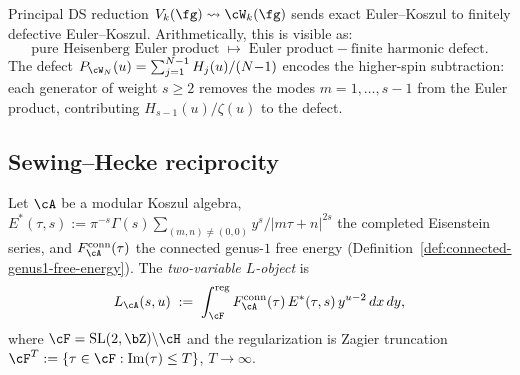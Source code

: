 \begin{remark}%
\label{rem:ds-arithmetic-defect}%
%
Principal DS reduction $V_k(\fg) \leadsto \cW_k(\fg)$
sends exact Euler--Koszul to finitely defective
Euler--Koszul.
Arithmetically, this is visible as:
\[
\text{pure Heisenberg Euler product}
\;\longmapsto\;
\text{Euler product} - \text{finite harmonic defect}.
\]
The defect $P_{\cW_N}(u) =
\sum_{j=1}^{N-1}H_j(u)/(N{-}1)$ encodes the higher-spin
subtraction: each generator of weight $s \geq 2$ removes
the modes $m = 1,\ldots,s{-}1$ from the Euler product,
contributing $H_{s-1}(u)/\zeta(u)$ to the defect.
\end{remark}

\subsection{Sewing--Hecke reciprocity}%
\label{subsec:two-variable-L}%
\label{subsec:sewing-hecke-reciprocity}%
%

\begin{definition}%
\label{def:two-variable-L}%
%
Let $\cA$ be a modular Koszul algebra,
$E^*(\tau,s) := \pi^{-s}\Gamma(s)\sum_{(m,n)\neq(0,0)}
y^s/|m\tau{+}n|^{2s}$
the completed Eisenstein series, and
$F_\cA^{\mathrm{conn}}(\tau)$
the connected genus-$1$ free energy
(Definition~\ref{def:connected-genus1-free-energy}).
The \emph{two-variable $L$-object} is
\begin{equation}\label{eq:two-variable-L}
L_\cA(s,u)
\;:=\;
\int_{\cF}^{\mathrm{reg}}
F_\cA^{\mathrm{conn}}(\tau)\,
E^*(\tau,s)\,
y^{u-2}\,dx\,dy,
\end{equation}
where $\cF = \mathrm{SL}(2,\bZ)\backslash\cH$ and the
regularization is Zagier truncation
$\cF^T := \{\tau \in \cF : \mathrm{Im}(\tau) \leq T\}$,
$T \to \infty$.
\end{definition}

